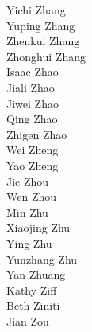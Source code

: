 Yichi Zhang\\
Yuping Zhang\\
Zhenkui Zhang\\
Zhonghui Zhang\\
Isaac Zhao\\
Jiali Zhao\\
Jiwei Zhao\\
Qing Zhao\\
Zhigen Zhao\\
Wei Zheng\\
Yao Zheng\\
Jie Zhou\\
Wen Zhou\\
Min Zhu\\
Xiaojing Zhu\\
Ying Zhu\\
Yunzhang Zhu\\
Yan Zhuang\\
Kathy Ziff\\
Beth Ziniti\\
Jian Zou\\
